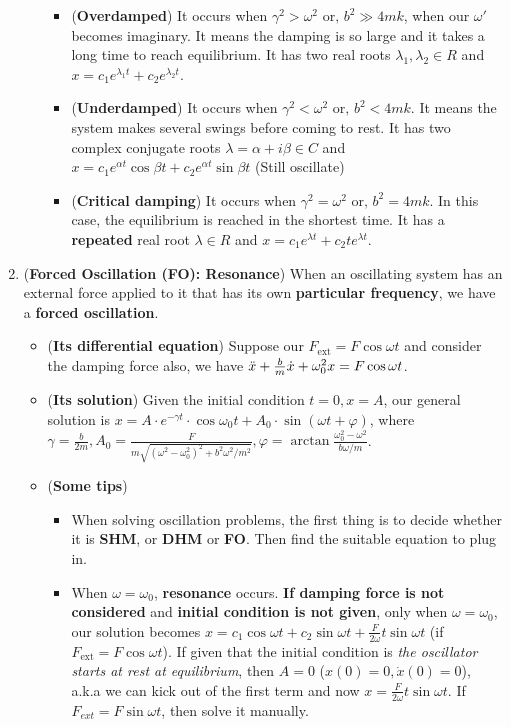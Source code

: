 \documentclass[10pt, landscape]{article}
\begin{document}
\begin{multicols}{4}
\begin{enumerate}
\begin{itemize}
        \begin{itemize}
            \item (\textbf{Overdamped}) It occurs when $\gamma^2>\omega^2\text{ or, }b^2\gg 4mk$, when our $\omega'$ becomes imaginary. It means the damping is so large and it takes a long time to reach equilibrium. It has two real roots $\lambda_1, \lambda_2 \in R$ and $x=c_1e^{\lambda_1 t}+c_2e^{\lambda_2 t}$. 
            \item (\textbf{Underdamped}) It occurs when $\gamma^2<\omega^2\text{ or, }b^2 < 4mk$. It means the system makes several swings before coming to rest. It has two complex conjugate roots $\lambda=\alpha+i\beta \in C$ and $x=c_1e^{\alpha t}\cos\beta t+c_2e^{\alpha t}\sin\beta t$ (Still oscillate)
            \item (\textbf{Critical damping}) It occurs when $\gamma^2=\omega^2\text{ or, }b^2=4mk$. In this case, the equilibrium is reached in the shortest time. It has a \textbf{repeated} real root $\lambda\in R$ and $x=c_1e^{\lambda t}+c_2te^{\lambda t}$.
        \end{itemize}
    \end{itemize}
  \item (\textbf{Forced Oscillation (FO): Resonance}) When an oscillating system has an external force applied to it that has its own \textbf{particular frequency}, we have a \textbf{forced oscillation}.
    \begin{itemize}
        \item (\textbf{Its differential equation}) Suppose our $F_{\text{ext}}=F\cos\omega t$ and consider the damping force also, we have $\Ddot{x}+\frac{b}{m}\Dot{x}+\omega_0^2x=F\cos\omega t$.
        \item (\textbf{Its solution}) Given the initial condition $t=0, x=A$, our general solution is $x=A\cdot e^{-\gamma t}\cdot\cos\omega_0t+A_0\cdot\sin(\omega t+\varphi)$, where $\gamma=\frac{b}{2m}, A_0=\frac{F}{m\sqrt{(\omega^2-\omega_0^2)^2+b^2\omega^2/m^2}}, \varphi=\arctan\frac{\omega_0^2-\omega^2}{b\omega/m}$.
        \item (\textbf{Some tips})
        \begin{itemize}
            \item When solving oscillation problems, the first thing is to decide whether it is \textbf{SHM}, or \textbf{DHM} or \textbf{FO}. Then find the suitable equation to plug in.
            \item When $\omega = \omega_0$, \textbf{resonance} occurs. \textbf{If damping force is not considered} and \textbf{initial condition is not given}, only when $\omega = \omega_0$, our solution becomes $x=c_1\cos \omega t+c_2 \sin\omega t + \frac{F}{2\omega}t\sin\omega t$ (if $F_{\text{ext}}=F\cos \omega t$). If given that the initial condition is \textit{the oscillator starts at rest at equilibrium}, then $A=0$ ($x(0)=0, \dot{x}(0)=0$), a.k.a we can kick out of the first term and now $x=\frac{F}{2\omega}t\sin\omega t$. If $F_{ext}=F\sin \omega t$, then solve it manually. \newline

\end{itemize}
\end{itemize}
\end{enumerate}
\end{multicols}
\end{document}
